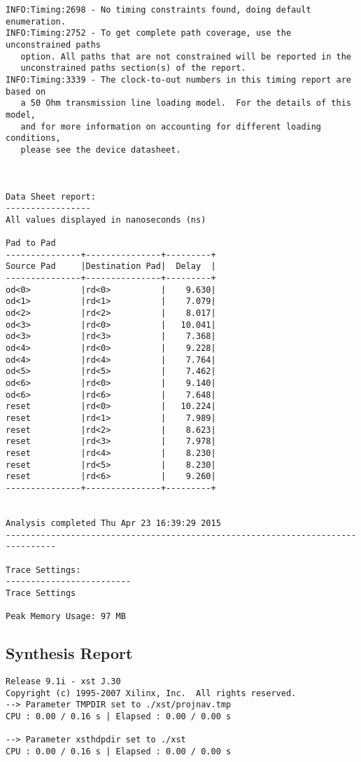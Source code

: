 \documentclass[14pt]{report}
\begin{document}
{\begin{verbatim}
INFO:Timing:2698 - No timing constraints found, doing default enumeration.
INFO:Timing:2752 - To get complete path coverage, use the unconstrained paths 
   option. All paths that are not constrained will be reported in the 
   unconstrained paths section(s) of the report.
INFO:Timing:3339 - The clock-to-out numbers in this timing report are based on 
   a 50 Ohm transmission line loading model.  For the details of this model, 
   and for more information on accounting for different loading conditions, 
   please see the device datasheet.



Data Sheet report:
-----------------
All values displayed in nanoseconds (ns)

Pad to Pad
---------------+---------------+---------+
Source Pad     |Destination Pad|  Delay  |
---------------+---------------+---------+
od<0>          |rd<0>          |    9.630|
od<1>          |rd<1>          |    7.079|
od<2>          |rd<2>          |    8.017|
od<3>          |rd<0>          |   10.041|
od<3>          |rd<3>          |    7.368|
od<4>          |rd<0>          |    9.228|
od<4>          |rd<4>          |    7.764|
od<5>          |rd<5>          |    7.462|
od<6>          |rd<0>          |    9.140|
od<6>          |rd<6>          |    7.648|
reset          |rd<0>          |   10.224|
reset          |rd<1>          |    7.989|
reset          |rd<2>          |    8.623|
reset          |rd<3>          |    7.978|
reset          |rd<4>          |    8.230|
reset          |rd<5>          |    8.230|
reset          |rd<6>          |    9.260|
---------------+---------------+---------+


Analysis completed Thu Apr 23 16:39:29 2015
--------------------------------------------------------------------------------

Trace Settings:
-------------------------
Trace Settings 

Peak Memory Usage: 97 MB
\end{verbatim}
\subsection*{Synthesis Report}
\begin{verbatim}
Release 9.1i - xst J.30
Copyright (c) 1995-2007 Xilinx, Inc.  All rights reserved.
--> Parameter TMPDIR set to ./xst/projnav.tmp
CPU : 0.00 / 0.16 s | Elapsed : 0.00 / 0.00 s
 
--> Parameter xsthdpdir set to ./xst
CPU : 0.00 / 0.16 s | Elapsed : 0.00 / 0.00 s
 

\end{verbatim}}
\end{document}
